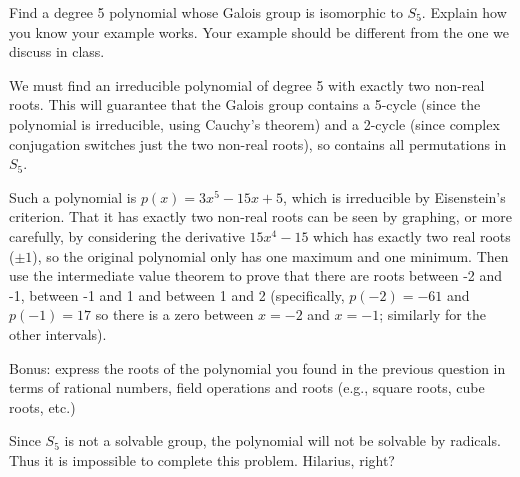 \documentclass[11pt]{exam}
\begin{document}
\begin{questions}
\begin{parts}
\end{parts}


\question[5] Find a degree 5 polynomial whose Galois group is isomorphic to $S_5$.  Explain how you know your example works.  Your example should be different from the one we discuss in class.

\begin{solution}
We must find an irreducible polynomial of degree 5 with exactly two non-real roots.  This will guarantee that the Galois group contains a 5-cycle (since the polynomial is irreducible, using Cauchy's theorem) and a 2-cycle (since complex conjugation switches just the two non-real roots), so contains all permutations in $S_5$.  

Such a polynomial is $p(x) = 3x^5 - 15x + 5$, which is irreducible by Eisenstein's criterion.  That it has exactly two non-real roots can be seen by graphing, or more carefully, by considering the derivative $15x^4 - 15$ which has exactly two real roots ($\pm 1$), so the original polynomial only has one maximum and one minimum.  Then use the intermediate value theorem to prove that there are roots between -2 and -1, between -1 and 1 and between 1 and 2 (specifically, $p(-2) = -61$ and $p(-1) = 17$ so there is a zero between $x = -2$ and $x = -1$; similarly for the other intervals).
\end{solution}


\bonusquestion[5000] Bonus: express the roots of the polynomial you found in the previous question in terms of rational numbers, field operations and roots (e.g., square roots, cube roots, etc.)
\begin{solution}
Since $S_5$ is not a solvable group, the polynomial will not be solvable by radicals. Thus it is impossible to complete this problem.  Hilarius, right?
\end{solution}

\end{questions}
\end{document}
